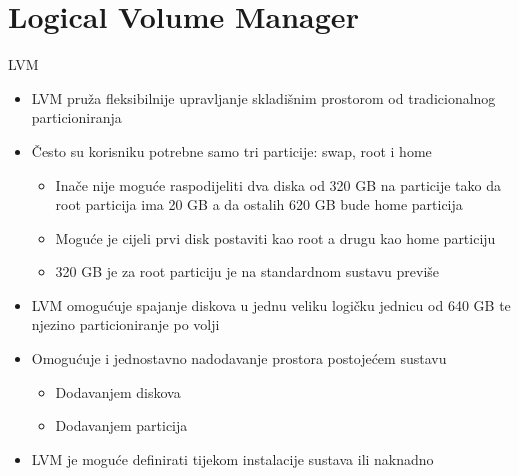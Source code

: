 \documentclass[croatian,t]{beamer} %
\begin{document}
    \section{Logical Volume Manager}
    \begin{frame}{LVM}
		\begin{itemize}
			\item LVM pruža fleksibilnije upravljanje skladišnim prostorom od tradicionalnog particioniranja
			\item Često su korisniku potrebne samo tri particije: swap, root i home
			\begin{itemize}
				\item Inače nije moguće raspodijeliti dva diska od 320 GB na particije tako da root particija ima 20 GB a da ostalih 620 GB bude home particija
				\item Moguće je cijeli prvi disk postaviti kao root a drugu kao home particiju
				\item 320 GB je za root particiju je na standardnom sustavu previše
			\end{itemize}
			\item LVM omogućuje spajanje diskova u jednu veliku logičku jednicu od 640 GB te njezino particioniranje po volji
			\item Omogućuje i jednostavno nadodavanje prostora postojećem sustavu
			\begin{itemize}
				\item Dodavanjem diskova
				\item Dodavanjem particija
			\end{itemize}
			\item LVM je moguće definirati tijekom instalacije sustava ili naknadno
		\end{itemize}
	\end{frame}
\end{document}
